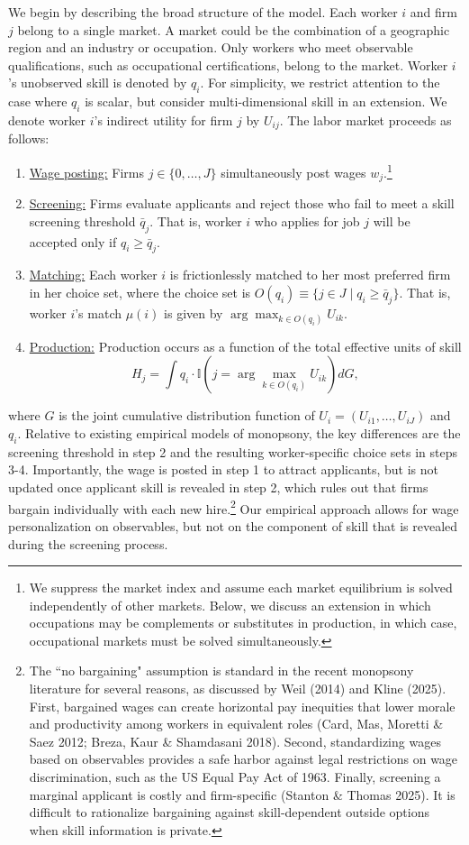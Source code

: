 \documentclass[11pt]{article}
\begin{document}
We begin by describing the broad structure of the model. Each worker $i$ and firm $j$ belong to a single market. A market could be the combination of a geographic region and an industry or occupation. Only workers who meet observable qualifications, such as occupational certifications, belong to the market. Worker $i$'s unobserved skill is denoted by $q_i$. For simplicity, we restrict attention to the case where $q_i$ is scalar, but consider multi-dimensional skill in an extension. We denote worker $i$'s indirect utility for firm $j$ by $U_{ij}$. The labor market proceeds as follows:
\begin{enumerate}
    \item \underline{Wage posting:} Firms $j \in \{0,\ldots,J\}$ simultaneously post wages $w_j$.\footnote{We suppress the market index and assume each market equilibrium is solved independently of other markets. Below, we discuss an extension in which occupations may be complements or substitutes in production, in which case, occupational markets must be solved simultaneously.}
    \item \underline{Screening:} Firms evaluate applicants and reject those who fail to meet a skill screening threshold $\bar{q}_j$. That is, worker $i$ who applies for  job $j$ will be accepted only if $q_i \geq \bar{q}_j$. 
    \item \underline{Matching:} Each worker $i$ is  frictionlessly matched to her most preferred firm in her choice set,  
where the choice set is $O(q_i) \equiv \{ j \in J \mid q_i \geq \bar{q}_j \}.$ That is, worker $i$'s match $\mu(i)$ is given by $\arg\max_{k \in O(q_i)} U_{ik}.$
    \item \underline{Production:} Production occurs as a function of the total effective units of skill
$$ H_j = \int q_i \cdot \mathbb{I}\left(j = \arg\max_{k \in O(q_i)} U_{ik} \right) dG,$$
\end{enumerate}
where $G$ is the joint cumulative distribution function of $U_i = (U_{i1},\ldots, U_{iJ})$ and $q_i$. Relative to existing empirical models of monopsony, the key differences are the screening threshold in step 2 and the resulting worker-specific choice sets in steps 3-4. Importantly, the wage is posted in step 1 to attract applicants, but is not updated once applicant skill is revealed in step 2, which rules out that firms bargain individually with each new hire.\footnote{The ``no bargaining" assumption is standard in the recent monopsony literature for several reasons, as discussed by Weil (2014) and Kline (2025). First, bargained wages can create horizontal pay inequities that lower morale and productivity among workers in equivalent roles (Card, Mas, Moretti \& Saez 2012; Breza, Kaur \& Shamdasani 2018). Second, standardizing wages based on observables provides a safe harbor against legal restrictions on wage discrimination, such as the US Equal Pay Act of 1963. Finally, screening a marginal applicant is costly  and firm-specific (Stanton \& Thomas 2025). It is difficult to rationalize bargaining against skill-dependent outside options when skill information is private.} Our empirical approach allows for wage personalization on observables, but not on the component of skill that is revealed during the screening process.   
\end{document}
